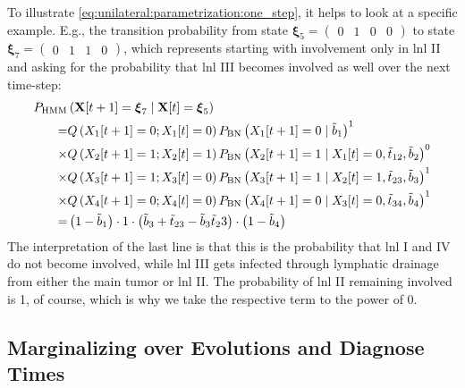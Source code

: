 \documentclass[\relativeRoot/main.tex]{subfiles}
\begin{document}
To illustrate \cref{eq:unilateral:parametrization:one_step}, it helps to look at a specific example. E.g., the transition probability from state $\boldsymbol{\xi}_5 = \begin{pmatrix} 0 & 1 & 0 & 0 \end{pmatrix}$ to state $\boldsymbol{\xi}_7 = \begin{pmatrix} 0 & 1 & 1 & 0 \end{pmatrix}$, which represents starting with involvement only in \gls{lnl} II and asking for the probability that \gls{lnl} III becomes involved as well over the next time-step:
%
\begin{equation}
    \begin{aligned}
        P_\text{HMM} &\left( \mathbf{X}[t+1] = \boldsymbol{\xi}_7 \mid \mathbf{X}[t] = \boldsymbol{\xi}_5 \right) \\
        = &Q \left( X_1[t+1] = 0; X_1[t] = 0 \right) P_\text{BN} \left( X_1[t+1] = 0 \mid \Tilde{b}_1 \right)^1 \\
        \times &Q \left( X_2[t+1] = 1; X_2[t] = 1 \right) P_\text{BN} \left( X_2[t+1] = 1 \mid X_1[t] = 0, \Tilde{t}_{12}, \Tilde{b}_2 \right)^0 \\
        \times &Q \left( X_3[t+1] = 1; X_3[t] = 0 \right) P_\text{BN} \left( X_3[t+1] = 1 \mid X_2[t] = 1, \Tilde{t}_{23}, \Tilde{b}_3 \right)^1 \\
        \times &Q \left( X_4[t+1] = 0; X_4[t] = 0 \right) P_\text{BN} \left( X_4[t+1] = 0 \mid X_3[t] = 0, \Tilde{t}_{34}, \Tilde{b}_4 \right)^1 \\
        = &\left( 1 - \Tilde{b}_1 \right) \cdot 1 \cdot \left( \Tilde{b}_3 + \Tilde{t}_{23} - \Tilde{b}_3 \Tilde{t}_23 \right) \cdot \left( 1 - \Tilde{b}_4 \right)
    \end{aligned}
\end{equation}
%
The interpretation of the last line is that this is the probability that \gls{lnl} I and IV do not become involved, while \gls{lnl} III gets infected through lymphatic drainage from either the main tumor or \gls{lnl} II. The probability of \gls{lnl} II remaining involved is 1, of course, which is why we take the respective term to the power of 0.

\subsection{Marginalizing over Evolutions and Diagnose Times}
\label{subsec:unilateral:formalism:marginalizing}
\end{document}

